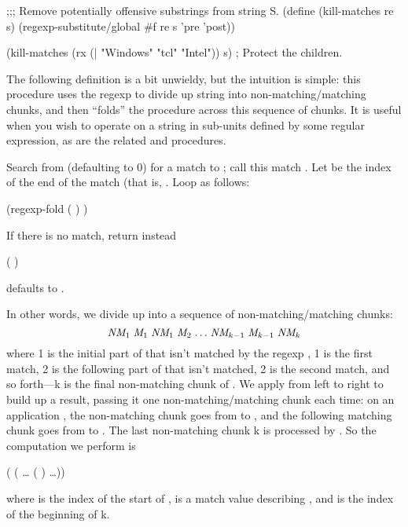 \begin{desc}
{\begin{widecode}
;;; Remove potentially offensive substrings from string S.
(define (kill-matches re s)
  (regexp-substitute/global #f re s 'pre 'post))

(kill-matches (rx (| "Windows" "tcl" "Intel")) s)   ; Protect the children.\end{widecode}}

\end{desc}

\begin{desc}
    The following definition is a bit unwieldy, but the intuition is
    simple: 
    this procedure uses the regexp  to divide up string  into
    non-matching/matching chunks, and then ``folds'' the procedure 
    across this sequence of chunks. It is useful when you wish to operate
    on a string in sub-units defined by some regular expression, as are
    the related  and  procedures.

    Search from  (defaulting to 0) for a match to ; call
    this match . Let  be the index of the end of the match
    (that is, . Loop as follows:
\begin{tightcode}    
(regexp-fold   (   )   )\end{tightcode}
%
    If there is no match, return instead 
\begin{tightcode}
(  )\end{tightcode}
%
     defaults to .

    In other words, we divide up  into a sequence of
    non-matching/matching chunks:
    $$ \mbox{\it{NM}}_{1} \; \mbox{\it{M}}_{1} \; \mbox{\it{NM}}_{1} \; \mbox{\it{M}}_{2} \; {\ldots} \;
                     \mbox{\it{NM}}_{k-1} \; \mbox{\it{M}}_{k-1} \; \mbox{\it{NM}}_{k} $$
%
    where 1 is the initial part of  that isn't matched by
    the regexp , 1 is the
    first match, 2 is the following part of  that
    isn't matched, 2 is the second match, 
    and so forth---k is the final non-matching chunk of
    . 
    We apply  from left to right to build up a result, passing it one
    non-matching/matching chunk each time: 
    on an application ,
    the non-matching chunk goes from  to , 
    and the following matching chunk goes from 
    to . The last non-matching chunk k
    is processed by . So the computation we perform is
\begin{centercode}
(  (   {\ldots} (   ) \ldots))\end{centercode}%
%
    where  is the index of the start of , 
     is a match value describing , 
    and  is the index of the beginning of k.


\end{desc}
